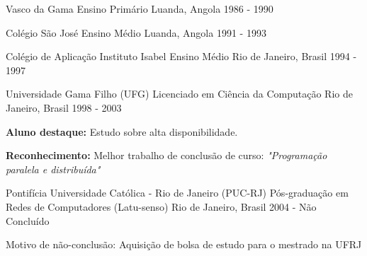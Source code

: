 


\begin{cventries}


\cventry
{Vasco da Gama} %
{Ensino Primário} %
{Luanda, Angola} %
{1986 - 1990} %
{ %
}


\cventry
{Colégio São José} %
{Ensino Médio} %
{Luanda, Angola} %
{1991 - 1993} %
{ %
}


\cventry
{Colégio de Aplicação Instituto Isabel} %
{Ensino Médio} %
{Rio de Janeiro, Brasil} %
{1994 - 1997} %
{ %
}


\cventry
{Universidade Gama Filho (UFG)} %
{Licenciado em Ciência da Computação} %
{Rio de Janeiro, Brasil} %
{1998 - 2003} %
{ %
\begin{cvitems}
    \item \textbf{Aluno destaque:} Estudo sobre alta disponibilidade.
    \item \textbf{Reconhecimento:} Melhor trabalho de conclusão de curso: \textit{"Programação paralela e distribuída"}
\end{cvitems}
}


\cventry
{Pontifícia Universidade Católica - Rio de Janeiro (PUC-RJ)} %
{Pós-graduação em Redes de Computadores (Latu-senso)} %
{Rio de Janeiro, Brasil} %
{2004 - Não Concluído} %
{ %
\begin{cvitems}
    \item {Motivo de não-conclusão: Aquisição de bolsa de estudo para o mestrado na UFRJ}
\end{cvitems}
}


\end{cventries}
